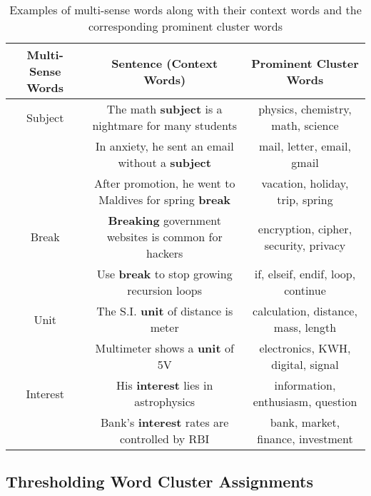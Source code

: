 \documentclass{ecai}
\begin{document}
\begin{table*}[h]
\captionsetup{font=small, skip=0pt}
\begin{center}
\caption{Examples of multi-sense words along with their context words and the corresponding prominent cluster words}
\vspace{0.5 em}
\small
\label{table:sensediasm}
\begin{tabular}{c|c|c} 
 \hline
  {\bf Multi-Sense Words } & {\bf Sentence (Context Words) } & {\bf  Prominent Cluster Words} \\
  \hline
  Subject & The math \textbf{subject} is a nightmare for many students & physics, chemistry, math, science \\
   & In anxiety, he sent an email without a \textbf{subject}  & mail, letter, email, gmail \\
  \hline
  & After promotion, he went to Maldives for spring \textbf{break}  & vacation, holiday, trip,  spring \\
  Break & \textbf{Breaking} government websites is common for hackers & encryption, cipher, security, privacy\\
   & Use \textbf{break} to stop growing recursion loops & if, elseif, endif, loop, continue \\
  \hline
  Unit & The S.I. \textbf{unit} of distance is meter & calculation, distance, mass, length \\
  & Multimeter shows a \textbf{unit} of 5V & electronics, KWH, digital, signal \\
  \hline
  Interest & His \textbf{interest} lies in astrophysics & information, enthusiasm, question\\
   & Bank’s \textbf{interest} rates are controlled by RBI & bank, market, finance,  investment \\
  \hline
\end{tabular}
\end{center}
\vspace{-1.8em}
\end{table*}

\subsection{Thresholding Word Cluster Assignments}
\label{subsec:hardthres}
\end{document}
